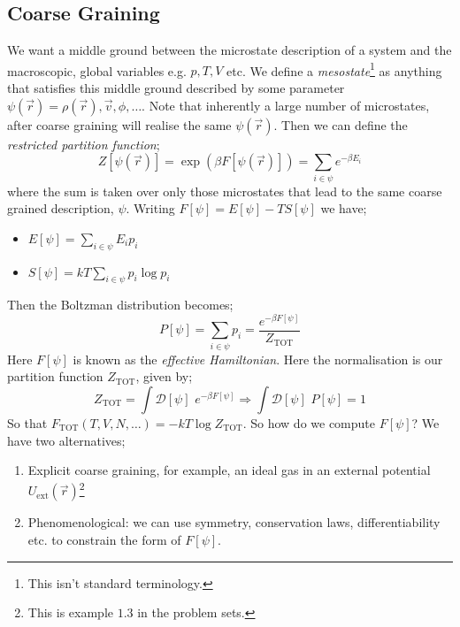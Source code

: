 \subsection{Coarse Graining}
We want a middle ground between the microstate description of a system and the macroscopic, global variables e.g. $p, T, V$ etc. We define a \emph{mesostate}\footnote{This isn't standard terminology.} as anything that satisfies this middle ground described by some parameter $\psi(\vec r) = \rho(\vec r), \vec v, \phi, \ldots$. Note that inherently a large number of microstates, after coarse graining will realise the same $\psi(\vec r)$. Then we can define the \emph{restricted partition function};
\begin{equation}
Z\left[\psi(\vec r)\right] = \exp\left(\beta F[\psi(\vec r)]\right) = \sum_{i \in \psi}{e^{-\beta E_i}}
\end{equation}
where the sum is taken over only those microstates that lead to the same coarse grained description, $\psi$. Writing $F[\psi] = E[\psi] - TS[\psi]$ we have;
\begin{itemize}
\item $E[\psi] = \sum_{i \in \psi}{E_i p_i}$
\item $S[\psi] = kT\sum_{i \in \psi}{p_i \log p_i}$
\end{itemize}
Then the Boltzman distribution becomes;
\begin{equation}
P[\psi] = \sum_{i \in \psi}{p_i} = \frac{e^{-\beta F[\psi]}}{Z_{\text{TOT}}}
\end{equation}
Here $F[\psi]$ is known as the \emph{effective Hamiltonian}. Here the normalisation is our partition function $Z_{\text{TOT}}$, given by;
\begin{equation}
Z_{\text{TOT}} = \int{\mathcal{D}[\psi]\,\,e^{-\beta F[\psi]}} \Rightarrow \int{\mathcal{D}[\psi]\,\,P[\psi]} = 1
\end{equation}
So that $F_{\text{TOT}}(T, V, N, \ldots) = -kT\log Z_{\text{TOT}}$. So how do we compute $F[\psi]$? We have two alternatives;
\begin{enumerate}
\item Explicit coarse graining, for example, an ideal gas in an external potential $U_{\text{ext}}(\vec r)$\footnote{This is example $1$.$3$ in the problem sets.}
\item Phenomenological: we can use symmetry, conservation laws, differentiability etc. to constrain the form of $F[\psi]$.
\end{enumerate}
